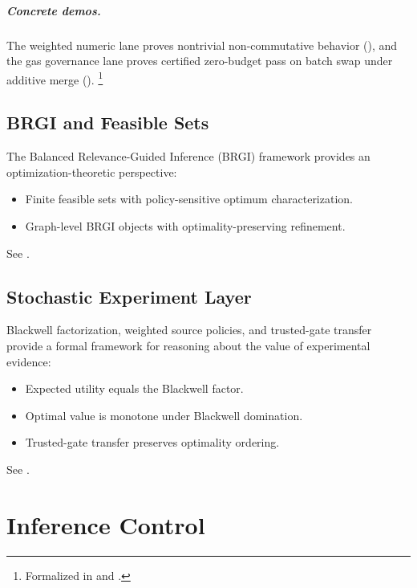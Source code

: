 \documentclass[11pt,openany]{report}
\begin{document}
\paragraph{Concrete demos.}
The weighted numeric lane proves nontrivial non-commutative behavior
(),
and the gas governance lane proves certified zero-budget pass on batch
swap under additive merge
().%
\footnote{Formalized in 
  and .}

\section{BRGI and Feasible Sets}

The Balanced Relevance-Guided Inference (BRGI) framework provides an
optimization-theoretic perspective:
\begin{itemize}
\item Finite feasible sets with policy-sensitive optimum characterization.
\item Graph-level BRGI objects with optimality-preserving refinement.
\end{itemize}

See .

\section{Stochastic Experiment Layer}

Blackwell factorization, weighted source policies, and trusted-gate
transfer provide a formal framework for reasoning about the value of
experimental evidence:
\begin{itemize}
\item Expected utility equals the Blackwell factor.
\item Optimal value is monotone under Blackwell domination.
\item Trusted-gate transfer preserves optimality ordering.
\end{itemize}

See .


\chapter{Inference Control}
\label{ch:inference-control}
\end{document}

